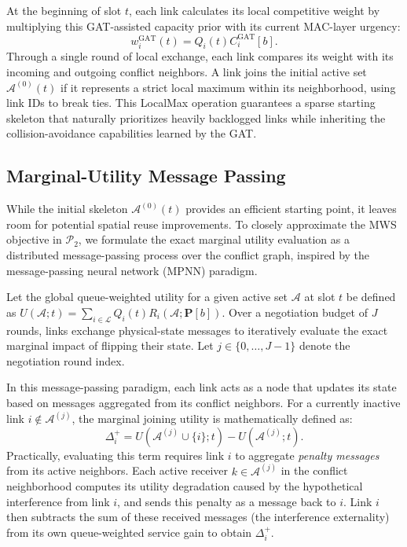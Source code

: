 \documentclass[letterpaper,journal]{IEEEtran}
\begin{document}
At the beginning of slot $t$, each link calculates its local competitive weight by multiplying this GAT-assisted capacity prior with its current MAC-layer urgency:
\begin{equation}
	w_i^{\mathrm{GAT}}(t) = Q_i(t) C_i^{\mathrm{GAT}}[b].
\end{equation}
Through a single round of local exchange, each link compares its weight with its incoming and outgoing conflict neighbors. A link joins the initial active set $\mathcal{A}^{(0)}(t)$ if it represents a strict local maximum within its neighborhood, using link IDs to break ties. This LocalMax operation guarantees a sparse starting skeleton that naturally prioritizes heavily backlogged links while inheriting the collision-avoidance capabilities learned by the GAT.

\subsection{Marginal-Utility Message Passing}
\label{ssec:marginal_utility}

While the initial skeleton $\mathcal{A}^{(0)}(t)$ provides an efficient starting point, it leaves room for potential spatial reuse improvements. To closely approximate the MWS objective in $\mathcal{P}_2$, we formulate the exact marginal utility evaluation as a distributed message-passing process over the conflict graph, inspired by the message-passing neural network (MPNN) paradigm\cite{MPNN}.

Let the global queue-weighted utility for a given active set $\mathcal{A}$ at slot $t$ be defined as $U(\mathcal{A}; t) = \sum_{i \in \mathcal{L}} Q_i(t) R_i(\mathcal{A}; \mathbf{P}[b])$. Over a negotiation budget of $J$ rounds, links exchange physical-state messages to iteratively evaluate the exact marginal impact of flipping their state. Let $j \in \{0, \dots, J-1\}$ denote the negotiation round index.

In this message-passing paradigm, each link acts as a node that updates its state based on messages aggregated from its conflict neighbors. For a currently inactive link $i \notin \mathcal{A}^{(j)}$, the marginal joining utility is mathematically defined as:
\begin{equation}
	\Delta_i^+ = U(\mathcal{A}^{(j)} \cup \{i\}; t) - U(\mathcal{A}^{(j)}; t).
\end{equation}
Practically, evaluating this term requires link $i$ to aggregate \textit{penalty messages} from its active neighbors. Each active receiver $k \in \mathcal{A}^{(j)}$ in the conflict neighborhood computes its utility degradation caused by the hypothetical interference from link $i$, and sends this penalty as a message back to $i$. Link $i$ then subtracts the sum of these received messages (the interference externality) from its own queue-weighted service gain to obtain $\Delta_i^+$.
\end{document}
